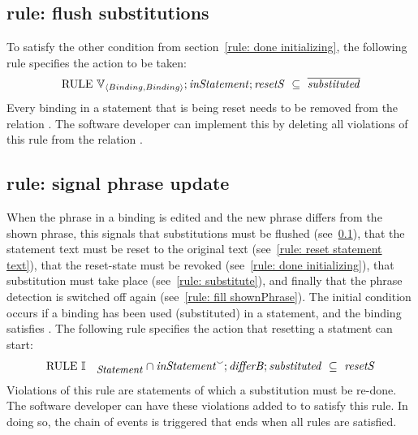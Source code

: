 \documentclass{svproc}
\begin{document}
\subsection{rule: flush substitutions}
\label{rule: flush substitutions}
	To satisfy the other condition from section~\ref{rule: done initializing},
	the following rule specifies the action to be taken:
\[\text{RULE}\ \fullt{Binding}{Binding};\id{inStatement} ;\id{resetS}\ \subs\ \overline{\id{substituted} }\]
	Every binding in a statement that is being reset needs to be removed from the relation .
	The software developer can implement this by deleting all violations of this rule from the relation .

\subsection{rule: signal phrase update}
\label{rule: signal phrase update}
	When the phrase in a binding is edited and the new phrase differs from the shown phrase,
	this signals that substitutions must be flushed (see~\ref{rule: flush substitutions}),
	that the statement text must be reset to the original text (see~\ref{rule: reset statement text}),
	that the reset-state must be revoked (see~\ref{rule: done initializing}),
	that substitution must take place (see~\ref{rule: substitute}),
	and finally that the phrase detection is switched off again (see~\ref{rule: fill shownPhrase}).
	The initial condition occurs if a binding has been used (substituted) in a statement,
	and the binding satisfies .
	The following rule specifies the action that resetting a statment can start:
\[\text{RULE}\ \ident{Statement}\cap \flip{\id{inStatement}};\id{{\it differB}};\id{substituted}\ \subs\ \id{resetS} \]
	Violations of this rule are statements of which a substitution must be re-done.
	The software developer can have these violations added to  to satisfy this rule.
	In doing so, the chain of events is triggered that ends when all rules are satisfied.
\end{document}
